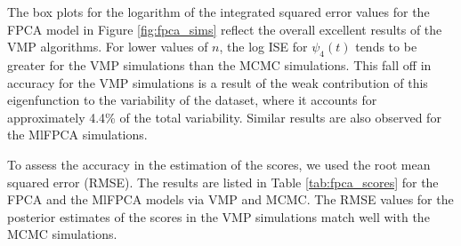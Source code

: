\documentclass[ba]{imsart}
\numberwithin{equation}{section}
\theoremstyle{plain}
\begin{document}

The box plots for the logarithm of the integrated squared error values for the FPCA model
in Figure \ref{fig:fpca_sims} reflect the overall excellent results of the VMP algorithms.
For lower values of $n$, the log ISE for $\psi_4 (t)$ tends to be greater for the VMP simulations
than the MCMC simulations. This fall off in accuracy for the VMP simulations is a result
of the weak contribution of this eigenfunction to the variability of the dataset, where it accounts for
approximately 4.4\% of the total variability. Similar results are also observed for the MlFPCA simulations.


To assess the accuracy in the estimation of the scores, we used the root mean squared error (RMSE).
The results are listed in Table \ref{tab:fpca_scores} for the FPCA and the MlFPCA models via VMP and MCMC.
The RMSE values for the posterior estimates of the scores in the VMP simulations match well with the MCMC
simulations.
\end{document}
